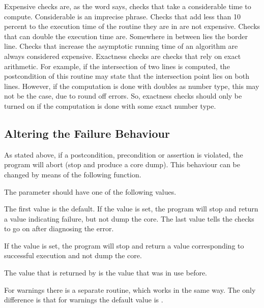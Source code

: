 Expensive checks are, as the word says, checks that take a considerable
time to compute. 
Considerable is an imprecise phrase. 
Checks that add less than 10 percent to the execution time of the routine 
they are in are not expensive.
Checks that can double the execution time are. 
Somewhere in between lies the border line.
Checks that increase the asymptotic running time of an algorithm are always 
considered expensive.
Exactness checks are checks that rely on exact arithmetic. 
For example, if the intersection of two lines is computed, the postcondition 
of this routine may state that the intersection point lies on both lines. 
However, if the computation is done with doubles as number type, this may not 
be the case, due to round off errors. 
So, exactness checks should only be turned on if the computation is done 
with some exact number type.

\subsection{Altering the Failure Behaviour}

As stated above, if a postcondition, precondition or assertion is
violated, the program will abort (stop and produce a core dump).
This behaviour can be changed by means of the following function.


\ccGlueBegin
{}
\ccGlueEnd

The parameter should have one of the following values.

The first value is the default. 
If the  value is set, the program will stop and return a value 
indicating failure, but not dump the core. 
The last value tells the checks to go on after diagnosing the error.

\begin{ccAdvanced}
If the  value is set, the program will stop and 
return a value corresponding to successful execution and not dump the core. 
\end{ccAdvanced}

The value that is returned by  is the value that was in use before.

For warnings there is a separate routine, which works in the same way.
The only difference is that for warnings the default value is
.

